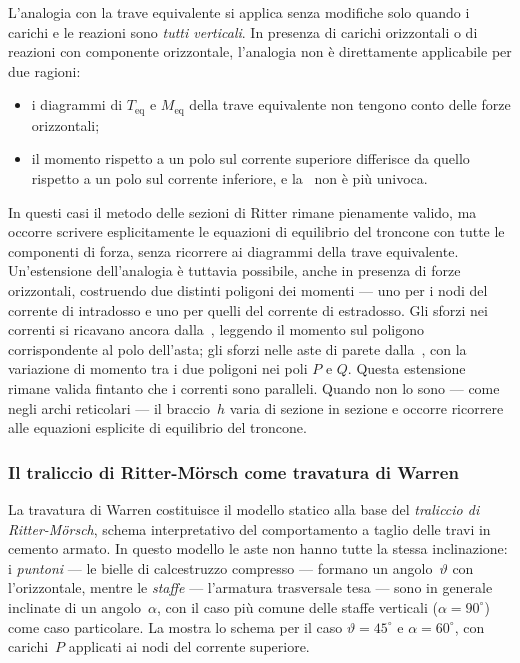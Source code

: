 L'analogia con la trave equivalente si applica
senza modifiche solo quando i carichi e le reazioni
sono \emph{tutti verticali}. In presenza di carichi
orizzontali o di reazioni con componente orizzontale,
l'analogia non è direttamente applicabile per due
ragioni:

\begin{itemize}[noitemsep]
	\item i diagrammi di $T_\text{eq}$ e
	$M_\text{eq}$ della trave equivalente non
	tengono conto delle forze orizzontali;
	\item il momento rispetto a un polo sul corrente
	superiore differisce da quello rispetto a
	un polo sul corrente inferiore, e
	la~ non è più univoca.
\end{itemize}

In questi casi il metodo delle sezioni di Ritter
rimane pienamente valido, ma occorre scrivere
esplicitamente le equazioni di equilibrio del
troncone con tutte le componenti di forza, senza
ricorrere ai diagrammi della trave equivalente.
Un'estensione dell'analogia è tuttavia possibile,
anche in presenza di forze orizzontali, costruendo
due distinti poligoni dei momenti --- uno per i nodi
del corrente di intradosso e uno per quelli del
corrente di estradosso. Gli sforzi nei correnti
si ricavano ancora dalla~,
leggendo il momento sul poligono corrispondente
al polo dell'asta; gli sforzi nelle aste di parete
dalla~, con la variazione
di momento tra i due poligoni nei poli $P$ e $Q$.
Questa estensione rimane valida fintanto che i
correnti sono paralleli. Quando non lo sono ---
come negli archi reticolari --- il braccio~$h$
varia di sezione in sezione e occorre ricorrere
alle equazioni esplicite di equilibrio del troncone.

\subsubsection{Il traliccio di Ritter-M\"{o}rsch come travatura di Warren}

La travatura di Warren costituisce il modello statico
alla base del \emph{traliccio di Ritter-Mörsch},
schema interpretativo del comportamento a taglio delle
travi in cemento armato. In questo modello le aste non
hanno tutte la stessa inclinazione: i \emph{puntoni}
--- le bielle di calcestruzzo compresso --- formano un
angolo~$\vartheta$ con l'orizzontale, mentre le
\emph{staffe} --- l'armatura trasversale tesa ---
sono in generale inclinate di un angolo~$\alpha$,
con il caso più comune delle staffe verticali
($\alpha = 90^\circ$) come caso particolare.
La  mostra lo schema
per il caso $\vartheta = 45^\circ$ e $\alpha = 60^\circ$,
con carichi~$P$ applicati ai nodi del corrente superiore.

